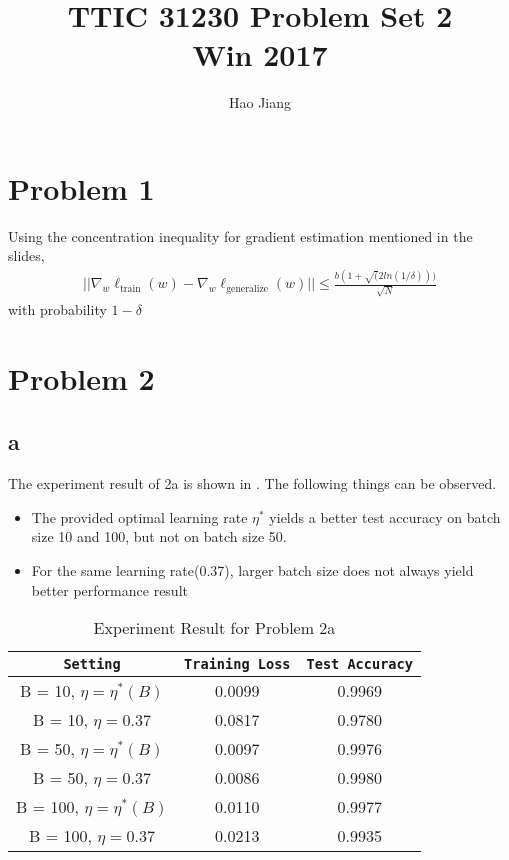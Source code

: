 \documentclass{article}
\title{TTIC 31230 Problem Set 2 \\ Win 2017}
\author{Hao Jiang}
\begin{document}
\maketitle

\section*{Problem 1}
Using the concentration inequality for gradient estimation mentioned in the
slides,
\begin{align*}
||\nabla_w\ell_{\text{train}}(w) - \nabla_w \ell_{\text{generalize}}(w)|| \leq
\frac{b(1+\sqrt(2ln(1/\delta)))}{\sqrt{N}}
\end{align*}
with probability $1-\delta$
\section*{Problem 2}
\subsection*{a}
The experiment result of 2a is shown in . The following things can be
observed.
\begin{itemize}
  \item The provided optimal learning rate $\eta^*$ yields a better test 
  accuracy on batch size 10 and 100, but not on batch size 50.
  \item For the same learning rate(0.37), larger batch size does not always yield
  better performance result
\end{itemize}

\begin{table}
\centering
\begin{tabular}{c|c|c}
\texttt{Setting} & \texttt{Training Loss} & \texttt{Test Accuracy} \\
\hline
B = 10, $\eta = \eta^*(B)$ & 0.0099 & 0.9969 \\
\hline
B = 10, $\eta = 0.37$ & 0.0817 & 0.9780\\
\hline
B = 50, $\eta = \eta^*(B)$ & 0.0097 & 0.9976 \\
\hline
B = 50, $\eta = 0.37$ & 0.0086 & 0.9980 \\
\hline
B = 100, $\eta = \eta^*(B)$ & 0.0110& 0.9977\\
\hline
B = 100, $\eta = 0.37$ & 0.0213 & 0.9935\\
\end{tabular}
\caption{Experiment Result for Problem 2a}
\label{tab:2a}
\end{table}
\end{document}
